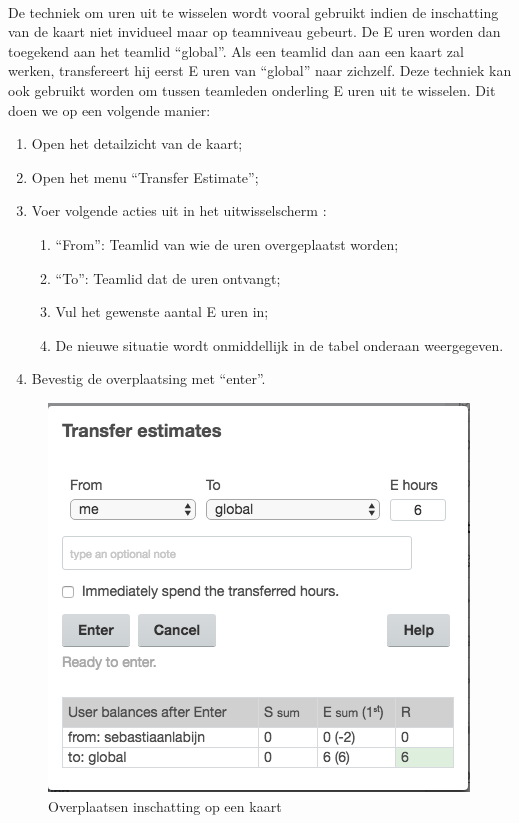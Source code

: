 \\
De techniek om uren uit te wisselen wordt vooral gebruikt indien de inschatting van de kaart niet invidueel maar op teamniveau gebeurt. De E uren worden dan toegekend aan het teamlid ``global''. Als een teamlid dan aan een kaart zal werken, transfereert hij eerst E uren van ``global'' naar zichzelf. Deze techniek kan ook gebruikt worden om tussen teamleden onderling E uren uit te wisselen. Dit doen we op een volgende manier:
\begin{enumerate}[nolistsep]
	\item Open het detailzicht van de kaart;
	\item Open het menu ``Transfer Estimate'';
	\item Voer volgende acties uit in het uitwisselscherm :
		\begin{enumerate}[nolistsep]
			\item ``From'': Teamlid van wie de uren overgeplaatst worden; 
			\item ``To'': Teamlid dat de uren ontvangt; 
			\item Vul het gewenste aantal E uren in;
			\item De nieuwe situatie wordt onmiddellijk in de tabel onderaan weergegeven.
		\end{enumerate}
	\item Bevestig de overplaatsing met ``enter''.
\end{enumerate}

\begin{figure}[h]
	\centering
	\includegraphics[scale=0.55]{./afbeeldingen/overzetten_prestatie.png}
	\caption{Overplaatsen inschatting op een kaart}
	\label{fig:overzetten_prestatie}	
\end{figure} 

